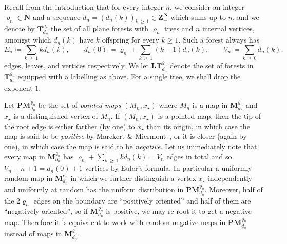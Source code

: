 \documentclass[10pt]{amsart}
\theoremstyle{definition}\newtheorem{defi}[theo]{Definition}\newtheorem{rema}[theo]{Remark}\newtheorem{exam}[theo]{Example}\newtheorem{exem}[theo]{Example}\newtheorem{nota}[theo]{Notation}
\newcommand{\ensembles}[1]{\mathbf{#1}}
\newcommand{\N}{\ensembles{N}}
\newcommand{\Z}{\ensembles{Z}}
\newcommand{\1}{\ensembles{1}}
\newcommand{\Tree}{\mathbf{T}}
\newcommand{\Map}{\mathbf{M}}
\newcommand{\PMap}{\mathbf{PM}}
\newcommand{\LTree}{\mathbf{LT}}
\renewcommand{\ge}{\geqslant}
\newcommand{\Fn}{\Tree_{d_n}^{\varrho_n}}
\newcommand{\PMn}{\PMap_{d_n}^{\varrho_n}}
\newcommand{\Mn}{\Map_{d_n}^{\varrho_n}}
\newcommand{\LFn}{\LTree_{d_n}^{\varrho_n}}
\newcommand{\edges}{E}
\newcommand{\vertices}{V}
\providecommand{\?}{}
\begin{document}
Recall from the introduction that for every integer $n$, we consider an integer $\varrho_n \in \N$ and a sequence $d_n = (d_n(k))_{k\,\ge\,1} \in \Z_+^{\N}$ which sums up to $n$, and we denote by $\Tree_{d_n}^{\varrho_n}$ the set of all plane forests with $\varrho_n$ trees and $n$ internal vertices, amongst which $d_n(k)$ have $k$ offspring for every $k \ge 1$. Such a forest always has
\[
\edges_n \coloneqq \sum_{k\,\ge\,1} k d_n(k),
\qquad d_n(0) \coloneqq \varrho_n + \sum_{k \,\ge\,1} (k-1) d_n(k),
\qquad
\vertices_n \coloneqq \sum_{k\,\ge\,0} d_n(k),
\]
edges, leaves, and vertices respectively. We let $\LFn$ denote the set of forests in $\Fn$ equipped with a labelling as above. For a single tree, we shall drop the exponent $1$.


Let $\PMn$ be the set of \emph{pointed maps} $(M_n, x_\star)$ where $M_n$ is a map in $\Mn$ and $x_\star$ is a distinguished vertex of $M_n$. If $(M_n, x_\star)$ is a pointed map, then the tip of the root edge is either farther (by one) to $x_\star$ than its origin, in which case the map is said to be \emph{positive} by Marckert \& Miermont~\cite{MM07}, or it is closer (again by one), in which case the map is said to be \emph{negative}. Let us immediately note that every map in $\Mn$ has $\varrho_n + \sum_{k \,\ge\,1} k d_n(k) = \vertices_n$ edges in total and so $\vertices_n - n + 1 = d_n(0) + 1$ vertices by Euler's formula. In particular a uniformly random map in $\Mn$ in which we further distinguish a vertex $x_\star$ independently and uniformly at random has the uniform distribution in $\PMn$. Moreover, half of the $2 \varrho_n$ edges on the boundary are ``positively oriented'' and half of them are ``negatively oriented'', so if $\Mn$ is positive, we may re-root it to get a negative map. Therefore it is equivalent to work with random negative maps in $\PMn$ instead of maps in $\Mn$.
\end{document}
